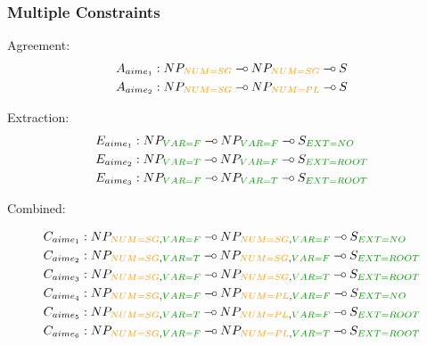 \documentclass{beamer}
\def\limp {\mathbin{{-}\mkern-3.5mu{\circ}}}
\begin{document}
\begin{frame}
  \frametitle{Multiple Constraints}
  Agreement:
    \begin{align*}
      A_{aime_1} &: NP_{\textcolor{darkgold}{NUM{=}SG}} \limp NP_{\textcolor{darkgold}{NUM{=}SG}} \limp S \\
      A_{aime_2} &: NP_{\textcolor{darkgold}{NUM{=}SG}} \limp NP_{\textcolor{darkgold}{NUM{=}PL}} \limp S
    \end{align*}

  Extraction:
    \begin{align*}
      E_{aime_1} &: NP_{\textcolor{darkgreen}{VAR{=}F}} \limp NP_{\textcolor{darkgreen}{VAR{=}F}} \limp S_{\textcolor{darkgreen}{EXT{=}NO}} \\
      E_{aime_2} &: NP_{\textcolor{darkgreen}{VAR{=}T}} \limp NP_{\textcolor{darkgreen}{VAR{=}F}} \limp S_{\textcolor{darkgreen}{EXT{=}ROOT}} \\
      E_{aime_3} &: NP_{\textcolor{darkgreen}{VAR{=}F}} \limp NP_{\textcolor{darkgreen}{VAR{=}T}} \limp S_{\textcolor{darkgreen}{EXT{=}ROOT}
}    \end{align*}

  Combined:
  \begin{small}
  \begin{align*}
      C_{aime_1} &: NP_{\textcolor{darkgold}{NUM{=}SG},\textcolor{darkgreen}{VAR{=}F}} \limp NP_{\textcolor{darkgold}{NUM{=}SG},\textcolor{darkgreen}{VAR{=}F}} \limp S_{\textcolor{darkgreen}{EXT{=}NO}} \\
      C_{aime_2} &: NP_{\textcolor{darkgold}{NUM{=}SG},\textcolor{darkgreen}{VAR{=}T}} \limp NP_{\textcolor{darkgold}{NUM{=}SG},\textcolor{darkgreen}{VAR{=}F}} \limp S_{\textcolor{darkgreen}{EXT{=}ROOT}} \\
      C_{aime_3} &: NP_{\textcolor{darkgold}{NUM{=}SG},\textcolor{darkgreen}{VAR{=}F}} \limp NP_{\textcolor{darkgold}{NUM{=}SG},\textcolor{darkgreen}{VAR{=}T}} \limp S_{\textcolor{darkgreen}{EXT{=}ROOT}} \\
      C_{aime_4} &: NP_{\textcolor{darkgold}{NUM{=}SG},\textcolor{darkgreen}{VAR{=}F}} \limp NP_{\textcolor{darkgold}{NUM{=}PL},\textcolor{darkgreen}{VAR{=}F}} \limp S_{\textcolor{darkgreen}{EXT{=}NO}} \\
      C_{aime_5} &: NP_{\textcolor{darkgold}{NUM{=}SG},\textcolor{darkgreen}{VAR{=}T}} \limp NP_{\textcolor{darkgold}{NUM{=}PL},\textcolor{darkgreen}{VAR{=}F}} \limp S_{\textcolor{darkgreen}{EXT{=}ROOT}} \\
      C_{aime_6} &: NP_{\textcolor{darkgold}{NUM{=}SG},\textcolor{darkgreen}{VAR{=}F}} \limp NP_{\textcolor{darkgold}{NUM{=}PL},\textcolor{darkgreen}{VAR{=}T}} \limp S_{\textcolor{darkgreen}{EXT{=}ROOT}
}  \end{align*}
  \end{small}
\end{frame}
\end{document}
